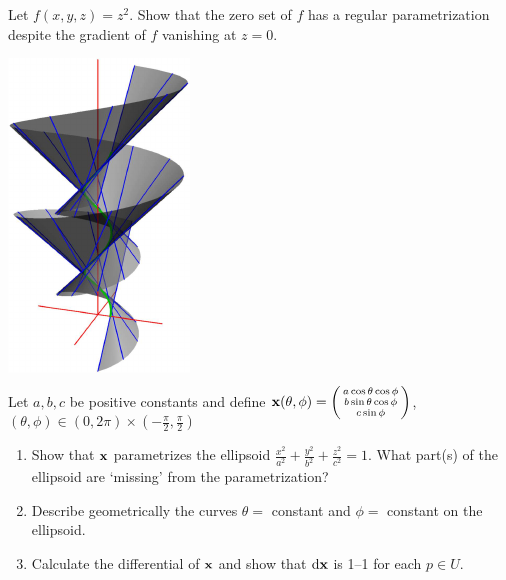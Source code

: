 \begin{exercises}
\begin{enumerate}
\begin{minipage}[t]{0.77\linewidth}
	  	\item Let $f(x,y,z)=z^2$. Show that the zero set of $f$ has a regular parametrization despite  the gradient of $f$ vanishing at $z=0$.
	  \end{minipage}
	  \hfill
	  \begin{minipage}[t]{0.21\linewidth}\vspace{-14pt}  			\flushright	\href{http://www.math.uci.edu/~ndonalds/math162a/surfaces-tandev.html}{\includegraphics{surfaces-tandev}}
	  \end{minipage}
	  
	
		\item Let $a,b,c$ be positive constants and define ${\mathbf{x}}(\theta,\phi)=\smash{\left(\begin{smallmatrix}a\cos\theta\cos\phi\\b\sin\theta\cos\phi\\c\sin\phi\end{smallmatrix}\right)}$, $(\theta,\phi)\in(0,2\pi)\times(-\frac\pi 2,\frac\pi 2)$
		\begin{enumerate}\itemsep0pt
			\item Show that ${\mathbf{x}}$ parametrizes the ellipsoid $\frac{x^2}{a^2}+\frac{y^2}{b^2}+\frac{z^2}{c^2}=1$.	What part(s) of the ellipsoid are `missing' from the parametrization?
			\item Describe geometrically the curves $\theta=\,\,$constant and $\phi=\,\,$constant on the ellipsoid.
			\item Calculate the differential of ${\mathbf{x}}$ and show that $\mathrm{d}{\mathbf{x}}$ is 1--1 for each $p\in U$.
		\end{enumerate}
		

\end{enumerate}
\end{exercises}
